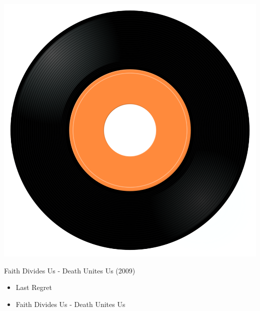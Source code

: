 \begin{minipage}[t]{0.25\textwidth}
\captionsetup{type=figure}
\includegraphics[width=\textwidth]{Images/cover.png}
\caption*{Faith Divides Us - Death Unites Us (2009)}
\end{minipage}
\begin{minipage}[t]{0.25\textwidth}\vspace{0pt}
\begin{itemize}[nosep,leftmargin=1em,labelwidth=*,align=left]
	\setlength{\itemsep}{0pt}
	\item Last Regret
	\item Faith Divides Us - Death Unites Us
\end{itemize}
\end{minipage}
